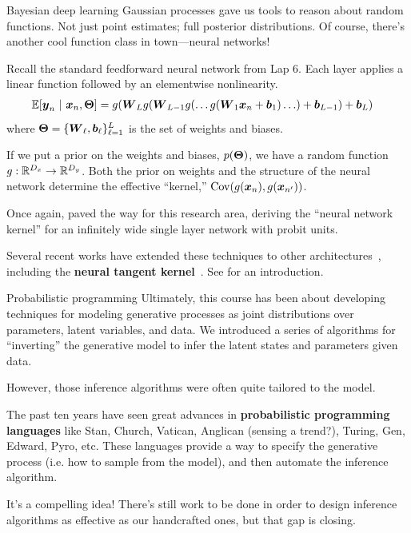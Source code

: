 \documentclass[aspectratio=169]{beamer}
\begin{document}
\begin{frame}{Bayesian deep learning}
Gaussian processes gave us tools to reason about random functions. Not just point estimates; full posterior distributions. Of course, there's another cool function class in town---neural networks!

Recall the standard feedforward neural network from Lap 6. Each layer applies a linear function followed by an elementwise nonlinearity. 
\begin{align}
    \mathbb{E}[\boldsymbol{y}_n ~\vert~ \boldsymbol{x}_n, \boldsymbol{\Theta}] &= g(\boldsymbol{W}_L g(\boldsymbol{W}_{L-1} g(\ldots g(\boldsymbol{W}_1 \boldsymbol{x}_n +  \boldsymbol{b}_1) \ldots ) + \boldsymbol{b}_{L-1}) + \boldsymbol{b}_L)
\end{align}
where $\boldsymbol{\Theta} = \{\boldsymbol{W}_\ell, \boldsymbol{b}_\ell\}_{\ell=1}^L$ is the set of weights and biases.

If we put a prior on the weights and biases, $p(\boldsymbol{\Theta})$, we have a random function $g: \mathbb{R}^{D_x} \to \mathbb{R}^{D_y}$. Both the prior on weights and the structure of the neural network determine the effective ``kernel,'' $\mathrm{Cov}(g(\boldsymbol{x}_n), g(\boldsymbol{x}_{n'}))$. 

Once again, \citet{neal1996bayesian} paved the way for this research area, deriving the ``neural network kernel'' for an infinitely wide single layer network with probit units.  

Several recent works have extended these techniques to other architectures~\citep{Garriga-Alonso2018-jx,De_G_Matthews2018-vo,Lee2017-sm,Yang2019-uu,Arora2019-uc}, including the \textbf{neural tangent kernel}~\citep{Jacot2018-dl}. See \cite{Wilson_undated-sv} for an introduction.

\end{frame}

\begin{frame}{Probabilistic programming}
Ultimately, this course has been about developing techniques for modeling generative processes as joint distributions over parameters, latent variables, and data. We introduced a series of algorithms for ``inverting'' the generative model to infer the latent states and parameters given data. 

However, those inference algorithms were often quite tailored to the model.

The past ten years have seen great advances in \textbf{probabilistic programming languages} like Stan, Church, Vatican, Anglican (sensing a trend?), Turing, Gen, Edward, Pyro, etc. These languages provide a way to specify the generative process (i.e. how to sample from the model), and then automate the inference algorithm. 

It's a compelling idea! There's still work to be done in order to design inference algorithms as effective as our handcrafted ones, but that gap is closing. 

\end{frame}
\end{document}
